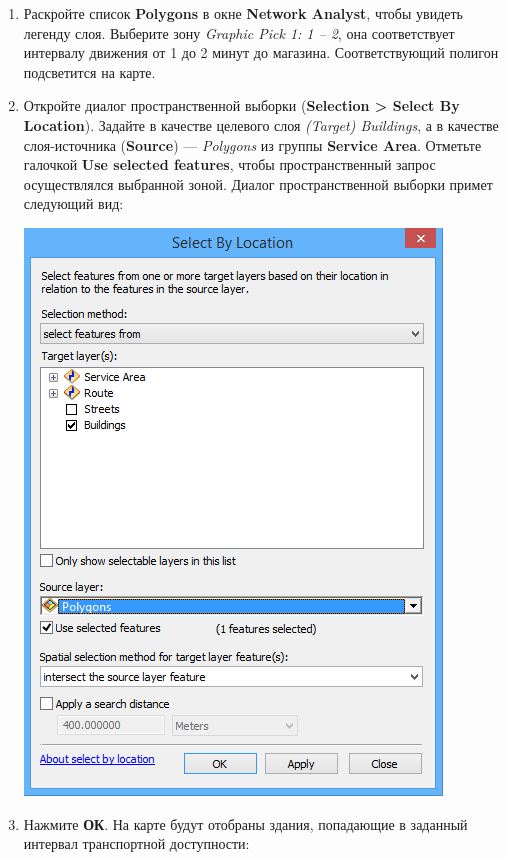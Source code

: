 \documentclass[12pt,]{book}
\begin{document}
\begin{enumerate}
\def\labelenumi{\arabic{enumi}.}
\item
  Раскройте список \textbf{Polygons} в окне \textbf{Network Analyst}, чтобы увидеть легенду слоя. Выберите зону \emph{Graphic Pick 1: 1 -- 2}, она соответствует интервалу движения от 1 до 2 минут до магазина. Соответствующий полигон подсветится на карте.
\item
  Откройте диалог пространственной выборки (\textbf{Selection \textgreater{} Select By Location}). Задайте в качестве целевого слоя \emph{(Target) Buildings}, а в качестве слоя-источника (\textbf{Source}) --- \emph{Polygons} из группы \textbf{Service Area}. Отметьте галочкой \textbf{Use selected features}, чтобы пространственный запрос осуществлялся выбранной зоной. Диалог пространственной выборки примет следующий вид:

  \includegraphics{images/Ex12/image18.png}
\item
  Нажмите \textbf{ОК}. На карте будут отобраны здания, попадающие в заданный интервал транспортной доступности:


\end{enumerate}
\end{document}
